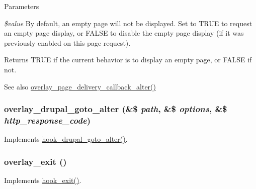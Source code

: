 \begin{DoxyParams}{Parameters}
\item[{\em \$value}]By default, an empty page will not be displayed. Set to TRUE to request an empty page display, or FALSE to disable the empty page display (if it was previously enabled on this page request).\end{DoxyParams}
\begin{DoxyReturn}{Returns}
TRUE if the current behavior is to display an empty page, or FALSE if not.
\end{DoxyReturn}
\begin{DoxySeeAlso}{See also}
\hyperlink{overlay_8module_a54e376c8ac21f0bbec738c1223a07a33}{overlay\_\-page\_\-delivery\_\-callback\_\-alter()} 
\end{DoxySeeAlso}
\hypertarget{overlay_8module_ad0368c6b16fb040fd8139e60e7b3b321}{
\subsubsection[{overlay\_\-drupal\_\-goto\_\-alter}]{\setlength{\rightskip}{0pt plus 5cm}overlay\_\-drupal\_\-goto\_\-alter (\&\$ {\em path}, \/  \&\$ {\em options}, \/  \&\$ {\em http\_\-response\_\-code})}}
\label{overlay_8module_ad0368c6b16fb040fd8139e60e7b3b321}
Implements \hyperlink{group__hooks_ga3c043f34f18e1c77daa341038a28e1ba}{hook\_\-drupal\_\-goto\_\-alter()}. \hypertarget{overlay_8module_a6fb08436be20a7885c50eaa84a413f6c}{
\subsubsection[{overlay\_\-exit}]{\setlength{\rightskip}{0pt plus 5cm}overlay\_\-exit ()}}
\label{overlay_8module_a6fb08436be20a7885c50eaa84a413f6c}
Implements \hyperlink{group__hooks_gaab945bbc2e651510aee460dcc8691366}{hook\_\-exit()}.

